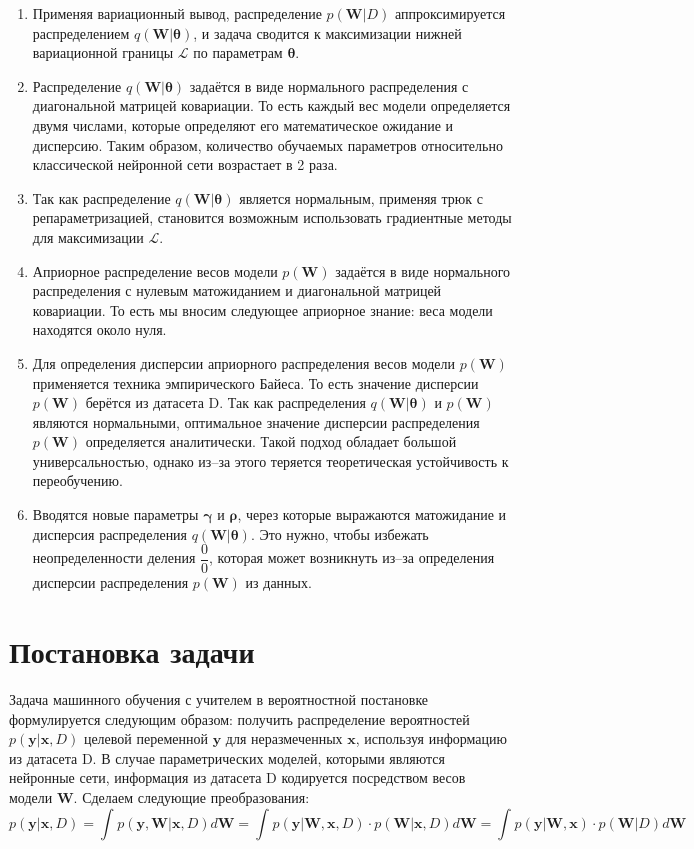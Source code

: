 \documentclass{article}
\begin{document}
\begin{enumerate}
 \item Применяя вариационный вывод, распределение $p(\pmb{W}| D)$ аппроксимируется распределением $q(\pmb{W} | \pmb{\theta})$, и задача сводится к максимизации нижней вариационной границы $\mathcal{L}$ по параметрам $\pmb{\theta}$.
 \item Распределение $q(\pmb{W} | \pmb{\theta})$ задаётся в виде нормального распределения с диагональной матрицей ковариации. То есть каждый вес модели определяется двумя числами, которые определяют его математическое ожидание и дисперсию. Таким образом, количество обучаемых параметров относительно классической нейронной сети возрастает в 2 раза.
 \item Так как распределение $q(\pmb{W} | \pmb{\theta})$ является нормальным, применяя трюк с репараметризацией, становится возможным использовать градиентные методы для максимизации $\mathcal{L}$.
 \item Априорное распределение весов модели $p(\pmb{W})$ задаётся в виде нормального распределения с нулевым матожиданием и диагональной матрицей ковариации. То есть мы вносим следующее априорное знание: веса модели находятся около нуля.
 \item Для определения дисперсии априорного распределения весов модели $p(\pmb{W})$ применяется техника эмпирического Байеса. То есть значение дисперсии $p(\pmb{W})$ берётся из датасета D. Так как распределения $q(\pmb{W} | \pmb{\theta})$ и $p(\pmb{W})$ являются нормальными, оптимальное значение дисперсии распределения $p(\pmb{W})$ определяется аналитически. Такой подход обладает большой универсальностью, однако из--за этого теряется теоретическая устойчивость к переобучению.
 \item Вводятся новые параметры $\pmb{\gamma}$ и $\pmb{\rho}$, через которые выражаются матожидание и дисперсия распределения $q(\pmb{W} | \pmb{\theta})$. Это нужно, чтобы избежать неопределенности деления $\dfrac{0}{0}$, которая может возникнуть из--за определения дисперсии распределения $p(\pmb{W})$ из данных.
\end{enumerate}

\section{Постановка задачи}

Задача машинного обучения с учителем в вероятностной постановке формулируется следующим образом: получить распределение вероятностей $p(\pmb{y} | \pmb{x}, D)$ целевой переменной $\pmb{y}$ для неразмеченных $\pmb{x}$, используя информацию из датасета D. В случае параметрических моделей, которыми являются нейронные сети, информация из датасета D кодируется посредством весов модели $\pmb{W}$. Сделаем следующие преобразования:
\[
 p(\pmb{y} | \pmb{x}, D) =
 \int_{}{} p(\pmb{y}, \pmb{W} | \pmb{x}, D) d \pmb{W} =
 \int_{}{} p(\pmb{y} | \pmb{W}, \pmb{x}, D) \cdot p(\pmb{W} | \pmb{x}, D) d \pmb{W} =
 \int_{}{} p(\pmb{y} | \pmb{W}, \pmb{x}) \cdot p(\pmb{W} | D) d \pmb{W}
\]
\end{document}

